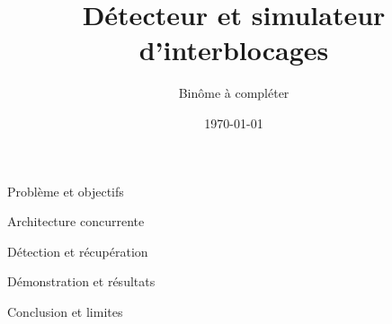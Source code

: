 \documentclass{beamer}
\title{Détecteur et simulateur d'interblocages}
\author{Binôme à compléter}
\date{\today}
\begin{document}
\begin{frame}\titlepage\end{frame}
\begin{frame}{Problème et objectifs}\end{frame}
\begin{frame}{Architecture concurrente}\end{frame}
\begin{frame}{Détection et récupération}\end{frame}
\begin{frame}{Démonstration et résultats}\end{frame}
\begin{frame}{Conclusion et limites}\end{frame}
\end{document}
